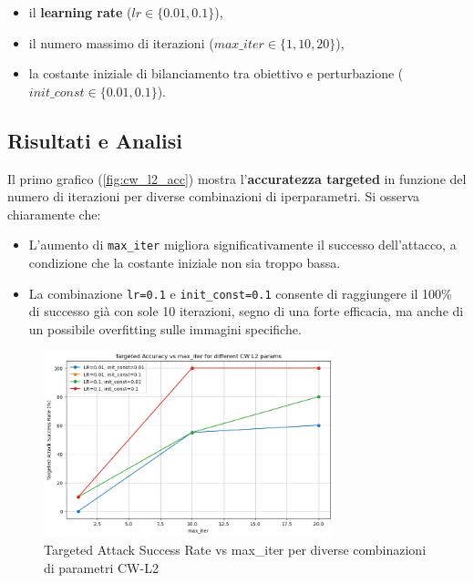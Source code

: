             \begin{itemize}
              \item il \textbf{learning rate} ($lr \in \{0.01, 0.1\}$),
              \item il numero massimo di iterazioni ($max\_iter \in \{1, 10, 20\}$),
              \item la costante iniziale di bilanciamento tra obiettivo e perturbazione ($init\_const \in \{0.01, 0.1\}$).
            \end{itemize}

        \subsection{Risultati e Analisi}
            Il primo grafico (\autoref{fig:cw_l2_acc}) mostra l'\textbf{accuratezza targeted} in funzione del numero di iterazioni per diverse combinazioni di iperparametri. Si osserva chiaramente che:
                \begin{itemize}
                  \item L’aumento di \texttt{max\_iter} migliora significativamente il successo dell’attacco, a condizione che la costante iniziale non sia troppo bassa.
                  
                  \item La combinazione \texttt{lr=0.1} e \texttt{init\_const=0.1} consente di raggiungere il 100\% di successo già con sole 10 iterazioni, segno di una forte efficacia, ma anche di un possibile overfitting sulle immagini specifiche.
                \end{itemize}
            
            \begin{figure}[H]
                \centering
                \includegraphics[width=0.75\textwidth]{images/cw_L2_accuracy_vs_maxiter.png}
                \caption{Targeted Attack Success Rate vs max\_iter per diverse combinazioni di parametri CW-L2}
                \label{fig:cw_l2_acc}
            \end{figure}
            
